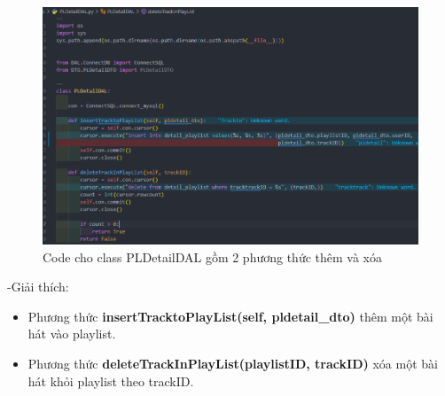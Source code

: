 \documentclass[a4paper]{article}
\begin{document}
\clearpage
\newpage
\begin{figure}[h]
	\centering
	\includegraphics[width=\textwidth]{PlayListDetail.png}
	\caption{Code cho class PLDetailDAL gồm 2 phương thức thêm và xóa}
\end{figure}
\begin{flushleft}
	-Giải thích:
	\begin{itemize}
		\item Phương thức \textbf{insertTracktoPlayList(self, pldetail\_dto)} thêm một bài hát vào playlist.

		\item Phương thức \textbf{deleteTrackInPlayList(playlistID, trackID)} xóa một bài hát khỏi playlist theo trackID.

	\end{itemize}
\end{flushleft}
\end{document}
